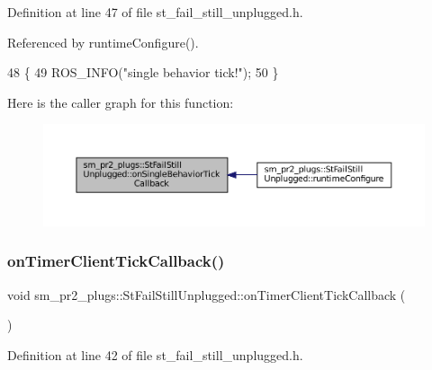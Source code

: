 Definition at line 47 of file st\+\_\+fail\+\_\+still\+\_\+unplugged.\+h.



Referenced by runtime\+Configure().


\begin{DoxyCode}
48     \{
49         ROS\_INFO(\textcolor{stringliteral}{"single behavior tick!"});
50     \}
\end{DoxyCode}
Here is the caller graph for this function\+:
\nopagebreak
\begin{figure}[H]
\begin{center}
\leavevmode
\includegraphics[width=350pt]{structsm__pr2__plugs_1_1StFailStillUnplugged_ac9dc49f0681e4d6a17b30461881b9572_icgraph}
\end{center}
\end{figure}
\mbox{\label{structsm__pr2__plugs_1_1StFailStillUnplugged_a9778180fa18c15f2d94c774ebde4c7cf}} 
\subsubsection{\texorpdfstring{on\+Timer\+Client\+Tick\+Callback()}{onTimerClientTickCallback()}}
{\footnotesize\ttfamily void sm\+\_\+pr2\+\_\+plugs\+::\+St\+Fail\+Still\+Unplugged\+::on\+Timer\+Client\+Tick\+Callback (\begin{DoxyParamCaption}{ }\end{DoxyParamCaption})\hspace{0.3cm}{\ttfamily [inline]}}



Definition at line 42 of file st\+\_\+fail\+\_\+still\+\_\+unplugged.\+h.




